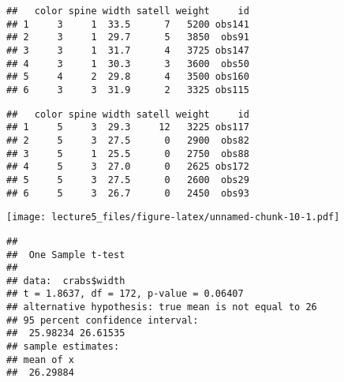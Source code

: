 \documentclass[]{article}
\newenvironment{Shaded}{\begin{snugshade}}{\end{snugshade}}
\newcommand{\CommentTok}[1]{\textcolor[rgb]{0.56,0.35,0.01}{\textit{#1}}}
\newcommand{\DataTypeTok}[1]{\textcolor[rgb]{0.13,0.29,0.53}{#1}}
\newcommand{\DecValTok}[1]{\textcolor[rgb]{0.00,0.00,0.81}{#1}}
\newcommand{\KeywordTok}[1]{\textcolor[rgb]{0.13,0.29,0.53}{\textbf{#1}}}
\newcommand{\NormalTok}[1]{#1}
\newcommand{\OperatorTok}[1]{\textcolor[rgb]{0.81,0.36,0.00}{\textbf{#1}}}
\newcommand{\StringTok}[1]{\textcolor[rgb]{0.31,0.60,0.02}{#1}}
\begin{document}
\begin{verbatim}
##   color spine width satell weight     id
## 1     3     1  33.5      7   5200 obs141
## 2     3     1  29.7      5   3850  obs91
## 3     3     1  31.7      4   3725 obs147
## 4     3     1  30.3      3   3600  obs50
## 5     4     2  29.8      4   3500 obs160
## 6     3     3  31.9      2   3325 obs115
\end{verbatim}

\begin{Shaded}
\end{Shaded}

\begin{verbatim}
##   color spine width satell weight     id
## 1     5     3  29.3     12   3225 obs117
## 2     5     3  27.5      0   2900  obs82
## 3     5     1  25.5      0   2750  obs88
## 4     5     3  27.0      0   2625 obs172
## 5     5     3  27.5      0   2600  obs29
## 6     5     3  26.7      0   2450  obs93
\end{verbatim}

\begin{Shaded}
\end{Shaded}

\texttt{[image: lecture5\_files/figure-latex/unnamed-chunk-10-1.pdf]}

\begin{Shaded}
\end{Shaded}

\begin{verbatim}
## 
##  One Sample t-test
## 
## data:  crabs$width
## t = 1.8637, df = 172, p-value = 0.06407
## alternative hypothesis: true mean is not equal to 26
## 95 percent confidence interval:
##  25.98234 26.61535
## sample estimates:
## mean of x 
##  26.29884
\end{verbatim}
\end{document}
